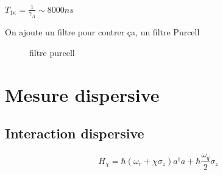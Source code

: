 $T_{1\kappa} = \frac{1}{\gamma_{A}} \sim 8000 ns $

On ajoute un filtre pour contrer ça, un filtre Purcell

\begin{figure}[ht]
    \centering
    \caption{filtre purcell}
    \label{fig:filtre-purcell}
\end{figure}

\section{Mesure dispersive }

\subsection{Interaction dispersive}


\[ H_{\chi} = \hbar \left( \omega_r + \chi \sigma_z  \right) a^{\dagger} a+ \hbar \frac{\omega_q}{2} \sigma_z  \]







